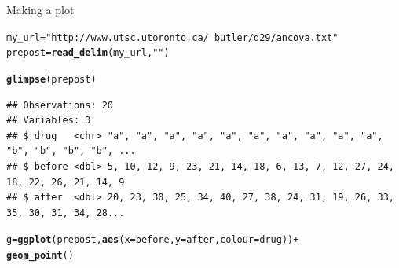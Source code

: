 \documentclass[unknownkeysallowed]{beamer}\usepackage[]{graphicx}\usepackage[]{color}
\makeatletter
\newcommand{\hlstr}[1]{\textcolor[rgb]{0.192,0.494,0.8}{#1}}%
\newcommand{\hlopt}[1]{\textcolor[rgb]{0,0,0}{#1}}%
\newcommand{\hlstd}[1]{\textcolor[rgb]{0.345,0.345,0.345}{#1}}%
\newcommand{\hlkwb}[1]{\textcolor[rgb]{0.69,0.353,0.396}{#1}}%
\newcommand{\hlkwc}[1]{\textcolor[rgb]{0.333,0.667,0.333}{#1}}%
\newcommand{\hlkwd}[1]{\textcolor[rgb]{0.737,0.353,0.396}{\textbf{#1}}}%
\newenvironment{kframe}{%
 \def\at@end@of@kframe{}%
 \ifinner\ifhmode%
  \def\at@end@of@kframe{\end{minipage}}%
  \begin{minipage}{\columnwidth}%
 \fi\fi%
 \def\FrameCommand##1{\hskip\@totalleftmargin \hskip-\fboxsep
 \colorbox{shadecolor}{##1}\hskip-\fboxsep
     \hskip-\linewidth \hskip-\@totalleftmargin \hskip\columnwidth}%
 \MakeFramed {\advance\hsize-\width
   \@totalleftmargin\z@ \linewidth\hsize
   \@setminipage}}%
 {\par\unskip\endMakeFramed%
 \at@end@of@kframe}
\newenvironment{knitrout}{}{} %
\makeatother
\begin{document}
\begin{frame}[fragile]{Making a plot}

 
\begin{knitrout}\small
{}\color{fgcolor}\begin{kframe}
\begin{alltt}
\hlstd{my_url}\hlkwb{=}\hlstr{"http://www.utsc.utoronto.ca/~butler/d29/ancova.txt"}
\hlstd{prepost}\hlkwb{=}\hlkwd{read_delim}\hlstd{(my_url,}\hlstr{" "}\hlstd{)}
\end{alltt}


{\ttfamily\noindent\itshape\color{messagecolor}{\#\# Parsed with column specification:\\\#\# cols(\\\#\#\ \  drug = col\_character(),\\\#\#\ \  before = col\_double(),\\\#\#\ \  after = col\_double()\\\#\# )}}\begin{alltt}
\hlkwd{glimpse}\hlstd{(prepost)}
\end{alltt}
\begin{verbatim}
## Observations: 20
## Variables: 3
## $ drug   <chr> "a", "a", "a", "a", "a", "a", "a", "a", "a", "a", "b", "b", "b", "b", ...
## $ before <dbl> 5, 10, 12, 9, 23, 21, 14, 18, 6, 13, 7, 12, 27, 24, 18, 22, 26, 21, 14, 9
## $ after  <dbl> 20, 23, 30, 25, 34, 40, 27, 38, 24, 31, 19, 26, 33, 35, 30, 31, 34, 28...
\end{verbatim}
\begin{alltt}
\hlstd{g}\hlkwb{=}\hlkwd{ggplot}\hlstd{(prepost,}\hlkwd{aes}\hlstd{(}\hlkwc{x}\hlstd{=before,}\hlkwc{y}\hlstd{=after,}\hlkwc{colour}\hlstd{=drug))}\hlopt{+}
  \hlkwd{geom_point}\hlstd{()}
\end{alltt}
\end{kframe}
\end{knitrout}
  
  
\end{frame}
\end{document}
